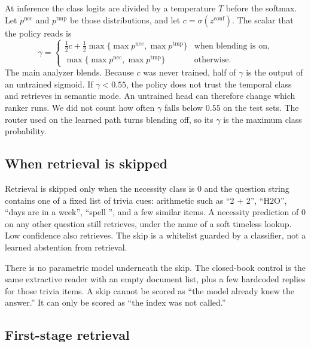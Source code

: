 \documentclass[11pt]{article}
\begin{document}
At inference the class logits are divided by a temperature $T$ before the softmax.
Let $p^{\mathrm{nec}}$ and $p^{\mathrm{tmp}}$ be those distributions, and let $c=\sigma(z^{\mathrm{conf}})$.
The scalar that the policy reads is
\begin{equation}
\gamma =
\begin{cases}
\tfrac12 c + \tfrac12 \max\{\max p^{\mathrm{nec}}, \max p^{\mathrm{tmp}}\}
& \text{when blending is on,}\\[0.3em]
\max\{\max p^{\mathrm{nec}}, \max p^{\mathrm{tmp}}\}
& \text{otherwise.}
\end{cases}
\label{eq:conf}
\end{equation}
The main analyzer blends.
Because $c$ was never trained, half of $\gamma$ is the output of an untrained sigmoid.
If $\gamma < 0.55$, the policy does not trust the temporal class and retrieves in semantic mode.
An untrained head can therefore change which ranker runs.
We did not count how often $\gamma$ falls below $0.55$ on the test sets.
The router used on the learned path turns blending off, so its $\gamma$ is the maximum class probability.

\subsection{When retrieval is skipped}
\label{sec:when}

Retrieval is skipped only when the necessity class is $0$ and the question string contains one of a fixed list of trivia cues: arithmetic such as ``2 + 2'', ``H2O'', ``days are in a week'', ``spell '', and a few similar items.
A necessity prediction of $0$ on any other question still retrieves, under the name of a soft timeless lookup.
Low confidence also retrieves.
The skip is a whitelist guarded by a classifier, not a learned abstention from retrieval.

There is no parametric model underneath the skip.
The closed-book control is the same extractive reader with an empty document list, plus a few hardcoded replies for those trivia items.
A skip cannot be scored as ``the model already knew the answer.''
It can only be scored as ``the index was not called.''

\subsection{First-stage retrieval}
\end{document}
